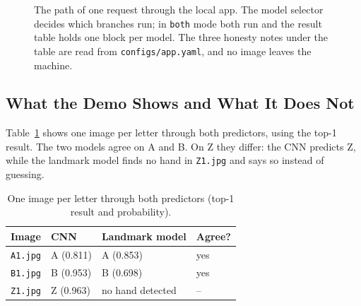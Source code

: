 \begin{figure}[htbp]
\centering
{}
\caption{The path of one request through the local app. The model selector decides which branches run; in \texttt{both} mode both run and the result table holds one block per model. The three honesty notes under the table are read from \texttt{configs/app.yaml}, and no image leaves the machine.}
\label{fig:app-flow}
\end{figure}

\subsection{What the Demo Shows and What It Does Not}

Table~\ref{tab:inference-demo} shows one image per letter through both predictors, using the top-1 result. The two models agree on A and B. On Z they differ: the CNN predicts Z, while the landmark model finds no hand in \texttt{Z1.jpg} and says so instead of guessing.

\begin{table}[h]
\centering
\caption{One image per letter through both predictors (top-1 result and probability).}
\label{tab:inference-demo}
\begin{tabular}{llll}
\hline
Image & CNN & Landmark model & Agree? \\
\hline
\texttt{A1.jpg} & A (0.811) & A (0.853) & yes \\
\texttt{B1.jpg} & B (0.953) & B (0.698) & yes \\
\texttt{Z1.jpg} & Z (0.963) & no hand detected & -- \\
\hline
\end{tabular}
\end{table}

